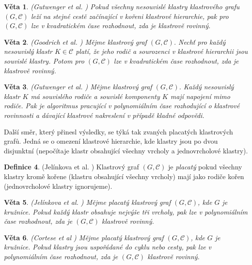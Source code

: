 \documentclass[12pt,a4report]{report}
\newtheorem{theorem}{Věta}[chapter]
\theoremstyle{definition}
\newtheorem{defn}[theorem]{Definice}
\begin{document}
\begin{theorem}(Gutwenger et al. \cite{GutwengerEtAl02})
Pokud všechny nesouvislé klastry klastrového grafu $(G, \mathcal C)$ leží na stejné cestě začínající v kořeni klastrové hierarchie, pak pro $(G, \mathcal C)$ lze v kvadratickém čase rozhodnout, zda je klastrově rovinný.
\end{theorem}

\begin{theorem}(Goodrich et al. \cite{GoodrichEtAl05})
Mějme klastrový graf $(G, \mathcal C)$. Nechť pro každý nesouvislý klastr $K \in \mathcal C$ platí, že jeho rodič a sourozenci v klastrové hierarchii jsou souvislé klastry. Potom pro $(G, \mathcal C)$ lze v kvadratickém čase rozhodnout, zda je klastrově rovinný.
\end{theorem}

\begin{theorem}(Gutwenger et al. \cite{GutwengerEtAl02})
Mějme klastrový graf $(G, \mathcal C)$. Každý nesouvislý klastr $K$ má souvislého rodiče a souvislé komponenty $K$ mají napojení mimo rodiče. Pak je algoritmus pracující v polynomiálním čase rozhodující o klastrové rovinnosti a dávající klastrové nakreslení v případě kladné odpovědi.
\end{theorem}

Další směr, který přinesl výsledky, se týká tak zvaných placatých klastrových grafů. Jedná se o omezení klastrové hierarchie, kde klastry jsou po dvou disjunktní (nepočítaje klastr obsahující všechny vrcholy a jednovrcholové klastry).

\begin{defn}(Jelínkova et al. \cite{JelinkovaEtAl07})
Klastrový graf $(G, \mathcal C)$ je \textit{placatý} pokud všechny klastry kromě kořene (klastru obsahující všechny vrcholy) mají jako rodiče kořen (jednovrcholové klastry ignorujeme).
\end{defn}

\begin{theorem}(Jelínkova et al. \cite{JelinkovaEtAl07})
Mějme placatý klastrový graf  $(G, \mathcal C)$, kde $G$ je kružnice. Pokud každý klastr obsahuje nejvýše tři vrcholy, pak lze v polynomiálním čase rozhodnout, zda je  $(G, \mathcal C)$ klastrově rovinný.
\end{theorem}

\begin{theorem}(Cortese et al \cite{CorteseEtAl04})
Mějme placatý klastrový graf  $(G, \mathcal C)$, kde $G$ je kružnice. Pokud klastry jsou uspořádané do cyklu nebo cesty, pak lze v polynomiálním čase rozhodnout, zda je  $(G, \mathcal C)$ klastrově rovinný.
\end{theorem}
\end{document}
